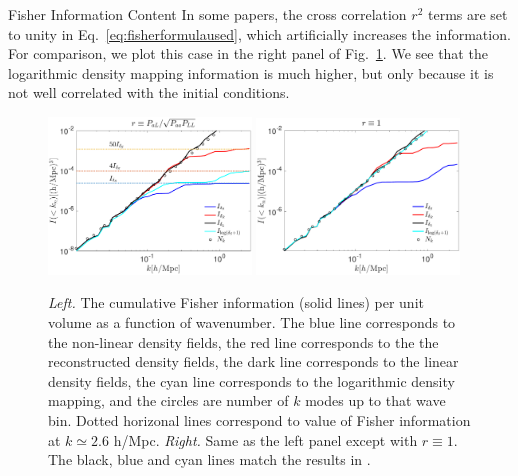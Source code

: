 \begin{section}{Fisher Information Content}
  In some papers, the cross correlation $r^2$ terms are set
  to unity in Eq.~\ref{eq:fisherformulaused}, which artificially
  increases the information.  For comparison, we plot this case in the right panel of 
  Fig.~\ref{fig:fisherinfo}.  We see that the logarithmic density
  mapping information is much higher, but only because it is not well
  correlated with the initial conditions.

  \begin{figure}
    \includegraphics[width=0.48\textwidth]{fig4a.pdf}
    \includegraphics[width=0.48\textwidth]{fig4b.pdf}
    \centering
    \caption{{\it Left.} The cumulative Fisher information (solid lines) per unit volume as
      a function of wavenumber.  The blue line corresponds to the
      non-linear density fields, the red line corresponds
      to the the reconstructed density fields, the dark line
      corresponds to the linear density fields, the cyan line
      corresponds to the logarithmic density mapping, and the circles
      are number of $k$ modes up to that wave bin.  Dotted horizonal lines correspond to value of 
      Fisher information at $k \simeq 2.6$ h/Mpc.  {\it Right.} Same
      as the left panel except with $r\equiv 1$. The black, blue and cyan lines
      match the results in \cite{bib:Rimes2006,bib:Mark2009}.}
  \label{fig:fisherinfo}
\end{figure}
\end{section}

